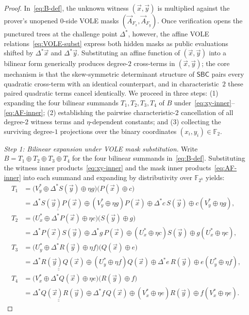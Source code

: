 \documentclass[11pt,a4paper]{article}
\theoremstyle{definition}
\theoremstyle{remark}
\newcommand{\Ftwo}{\mathbb{F}_2}
\newcommand{\Ftwok}{\mathbb{F}_{2^k}}
\newcommand{\SBC}{\mathsf{SBC}}
\begin{document}
\begin{proof}
In~\eqref{eq:B-def}, the unknown witness $(\vec{x}, \vec{y})$ is multiplied against the prover's unopened $0$-side VOLE masks $(\vec{A}_{F_x}, \vec{A}_{F_y})$. Once verification opens the punctured trees at the challenge point $\Delta^*$, however, the affine VOLE relations~\eqref{eq:VOLE-subst} express both hidden masks as public evaluations shifted by $\Delta^*\vec{x}$ and $\Delta^*\vec{y}$. Substituting an affine function of $(\vec{x}, \vec{y})$ into a bilinear form generically produces degree-$2$ cross-terms in $(\vec{x}, \vec{y})$; the core mechanism is that the skew-symmetric determinant structure of $\SBC$ pairs every quadratic cross-term with an identical counterpart, and in characteristic~$2$ these paired quadratic terms cancel identically. We proceed in three steps: (1) expanding the four bilinear summands $T_1, T_2, T_3, T_4$ of $B$ under~\eqref{eq:xy-inner}--\eqref{eq:AF-inner}; (2) establishing the pairwise characteristic-$2$ cancellation of all degree-$2$ witness terms and $\eta$-dependent constants; and (3) collecting the surviving degree-$1$ projections over the binary coordinates $(x_i, y_i) \in \Ftwo$.

\smallskip\noindent
\emph{Step 1: Bilinear expansion under VOLE mask substitution.}
Write $B = T_1 \oplus T_2 \oplus T_3 \oplus T_4$ for the four bilinear summands in~\eqref{eq:B-def}. Substituting the witness inner products~\eqref{eq:xy-inner} and the mask inner products~\eqref{eq:AF-inner} into each summand and expanding by distributivity over $\Ftwok$ yields:
\begin{align}
T_1 &= \big(V_y^* \oplus \Delta^* S(\vec{y}) \oplus \eta g\big)\big(P(\vec{x}) \oplus c\big) \nonumber \\
    &= \underline{\Delta^* S(\vec{y}) P(\vec{x})} \oplus (V_y^* \oplus \eta g) P(\vec{x}) \oplus \Delta^* c \, S(\vec{y}) \oplus c(V_y^* \oplus \eta g), \label{eq:T1} \\[4pt]
T_2 &= \big(U_x^* \oplus \Delta^* P(\vec{x}) \oplus \eta c\big)\big(S(\vec{y}) \oplus g\big) \nonumber \\
    &= \underline{\Delta^* P(\vec{x}) S(\vec{y})} \oplus \Delta^* g \, P(\vec{x}) \oplus (U_x^* \oplus \eta c) S(\vec{y}) \oplus g(U_x^* \oplus \eta c), \label{eq:T2} \\[4pt]
T_3 &= \big(U_y^* \oplus \Delta^* R(\vec{y}) \oplus \eta f\big)\big(Q(\vec{x}) \oplus e\big) \nonumber \\
    &= \underline{\underline{\Delta^* R(\vec{y}) Q(\vec{x})}} \oplus (U_y^* \oplus \eta f) Q(\vec{x}) \oplus \Delta^* e \, R(\vec{y}) \oplus e(U_y^* \oplus \eta f), \label{eq:T3} \\[4pt]
T_4 &= \big(V_x^* \oplus \Delta^* Q(\vec{x}) \oplus \eta e\big)\big(R(\vec{y}) \oplus f\big) \nonumber \\
    &= \underline{\underline{\Delta^* Q(\vec{x}) R(\vec{y})}} \oplus \Delta^* f \, Q(\vec{x}) \oplus (V_x^* \oplus \eta e) R(\vec{y}) \oplus f(V_x^* \oplus \eta e). \label{eq:T4}
\end{align}


\end{proof}
\end{document}
